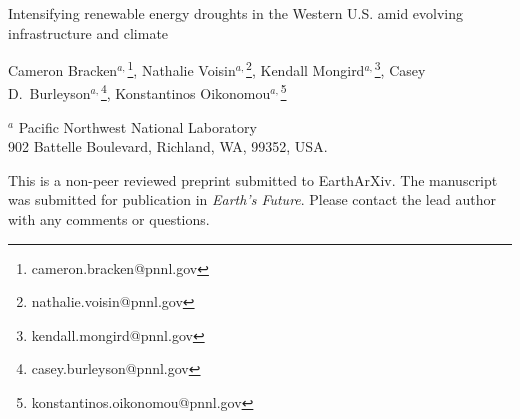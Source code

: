 \documentclass[a4paper]{article}
\begin{document}

\Large
 \begin{center}
Intensifying renewable energy droughts in the Western U.S. amid evolving infrastructure and climate\\ 

\hspace{10pt}

\large
Cameron Bracken$^{a,}$\footnote{cameron.bracken@pnnl.gov}, 
Nathalie Voisin$^{a,}$\footnote{nathalie.voisin@pnnl.gov}, 
Kendall Mongird$^{a,}$\footnote{kendall.mongird@pnnl.gov},
Casey D.\ Burleyson$^{a,}$\footnote{casey.burleyson@pnnl.gov}, 
Konstantinos Oikonomou$^{a,}$\footnote{konstantinos.oikonomou@pnnl.gov}\\

\hspace{10pt}

\small  
$^a$ Pacific Northwest National Laboratory\\
902 Battelle Boulevard, Richland, WA, 99352, USA. 

\end{center}

\normalsize 

This is a non-peer reviewed preprint submitted to EarthArXiv. The manuscript was submitted for publication in \textit{Earth's Future}. Please contact the lead author with any comments or questions. 
\end{document}
